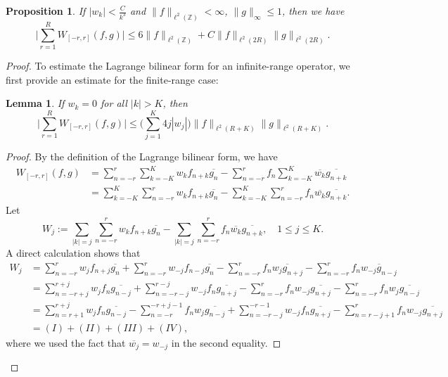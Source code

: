 \documentclass[11pt]{amsart}
\newtheorem{lemma}[theorem]{Lemma}
\newtheorem{proposition}[theorem]{Proposition}
\theoremstyle{remark}
\theoremstyle{definition}
\newcommand{\Z}{{\mathbf Z}}
\def \Z{\mathcal{Z}}
\def\Z{{\mathbb Z}}
\begin{document}
\begin{proposition}\label{green1}
If \( |w_k| < \frac{C}{k^3} \) and \( \|f\|_{\ell^2(\mathbb{Z})} < \infty \), \( \|g\|_{\infty} \leq 1 \), then we have
$$\bigg|\sum_{r=1}^{R}W_{[-r,r]}(f,g)\bigg|\leq  {6\|f\|_{\ell^2(\Z)}}+C\|f\|_{\ell^2(2R)}\|g\|_{\ell^2(2R)}.$$
\end{proposition}
\begin{proof} To estimate the Lagrange bilinear form for an infinite-range operator, we first provide an estimate for the finite-range case:
\begin{lemma}\label{finite}
If \( w_k = 0 \) for all \( |k| > K \), then
$$\bigg|\sum_{r=1}^{R}W_{[-r,r]}(f,g)\bigg|\leq 
 \big(\sum_{j=1}^{K}4j|w_j| \big) \|f\|_{\ell^2(R+K)}\|g\|_{\ell^2(R+K)}.$$
	 \end{lemma}
\begin{proof} By the definition of the Lagrange bilinear form, we have \begin{align*}
W_{[-r,r]}(f,g) &= \sum_{n=-r}^{r} \sum_{k=-K}^{K} w_k f_{n+k} \overline{g_n} - \sum_{n=-r}^{r} f_n \sum_{k=-K}^{K} \overline{w_k} \overline{g_{n+k}} \\
&= \sum_{k=-K}^{K} \sum_{n=-r}^{r} w_k f_{n+k} \overline{g_n} - \sum_{k=-K}^{K} \sum_{n=-r}^{r} f_n \overline{w_k} \overline{g_{n+k}}.
\end{align*}
Let $$
W_j := \sum_{|k|=j} \sum_{n=-r}^{r} w_k f_{n+k} \overline{g_n} - \sum_{|k|=j}\sum_{n=-r}^{r} f_n \overline{w_k} \overline{g_{n+k}}, \quad 1 \leq j \leq K.
$$ A direct calculation shows that \begin{align*}
W_j &= \sum_{n=-r}^{r} w_j f_{n+j} \overline{g_n} + \sum_{n=-r}^{r} w_{-j} f_{n-j} \overline{g_n} - \sum_{n=-r}^{r} f_n \overline{w_j g_{n+j}} - \sum_{n=-r}^{r} f_n \overline{w_{-j} g_{n-j}} \\
&= \sum_{n=-r+j}^{r+j} w_j f_n \overline{g_{n-j}} + \sum_{n=-r-j}^{r-j} w_{-j} f_n \overline{g_{n+j}} - \sum_{n=-r}^{r} f_n w_{-j} \overline{g_{n+j}} - \sum_{n=-r}^{r} f_n w_j \overline{g_{n-j}} \\
&= \sum_{n=r+1}^{r+j} w_j f_n \overline{g_{n-j}} - \sum_{n=-r}^{-r+j-1} f_n w_j \overline{g_{n-j}} + \sum_{n=-r-j}^{-r-1} w_{-j} f_n \overline{g_{n+j}} - \sum_{n=r-j+1}^{r} f_n w_{-j} \overline{g_{n+j}} \\
&= (I) + (II) + (III) + (IV),
\end{align*} where we used the fact that $ \overline{w_j} = w_{-j} $ in the second equality.


\end{proof}
\end{proof}
\end{document}
